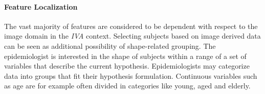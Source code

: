 \documentclass[journal]{style/vgtc} 			          %
\begin{document}
\paragraph{Feature Localization}
The vast majority of features are considered to be dependent with respect to the image domain in the \emph{IVA} context.
%
Selecting subjects based on image derived data can be seen as additional possibility of shape-related grouping.
%
The epidemiologist is interested in the shape of subjects within a range of a set of variables that describe the current hypothesis.
%
Epidemiologists may categorize data into groups that fit their hypothesis formulation.
%
Continuous variables such as age are for example often divided in categories like young, aged and elderly.
%
%

\end{document}
